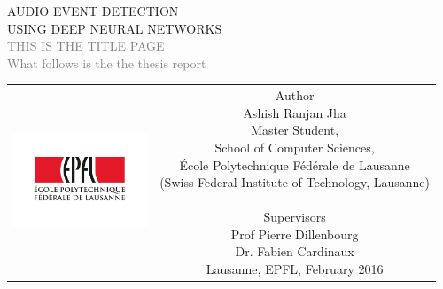 \begin{titlepage}
\begin{center}
\sffamily


\null\vspace{2cm}
{\huge AUDIO EVENT DETECTION \\[12pt] USING DEEP NEURAL NETWORKS} \\[24pt] 
\textcolor{gray}{\small{THIS IS THE TITLE PAGE \\ What follows is the the thesis report}}
    
\vfill

\begin{tabular} {cc}
\parbox{0.3\textwidth}{\includegraphics[width=4cm]{images/epfl}}
&
\parbox{0.7\textwidth}{%
	Author\\ [4pt]
    Ashish Ranjan Jha\\
	Master Student,\\
    School of Computer Sciences,\\
%
	École Polytechnique Fédérale de Lausanne\\
	(Swiss Federal Institute of Technology, Lausanne)\\
	\\ [6pt]
%
\small
Supervisors\\[4pt]
%
    Prof Pierre Dillenbourg\\
    Dr. Fabien Cardinaux\\[12pt]
%
Lausanne, EPFL, February 2016}
\end{tabular}
\end{center}
\vspace{2cm}
\end{titlepage}



